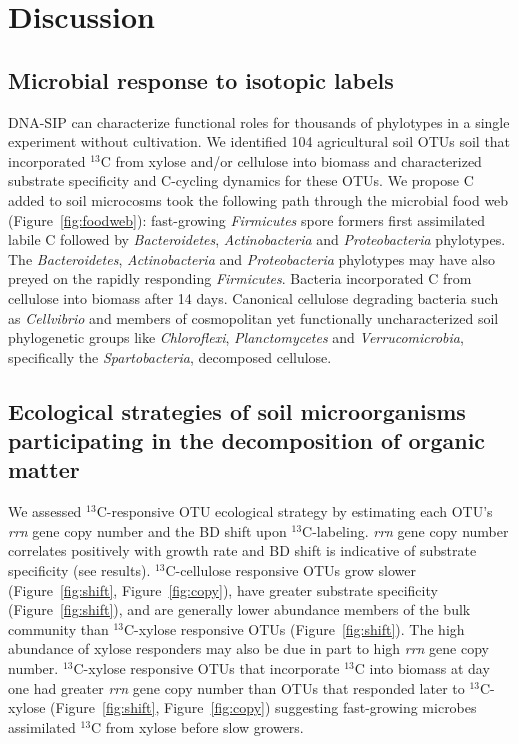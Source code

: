 \section{Discussion} 
\subsection{Microbial response to isotopic labels}
DNA-SIP can characterize functional roles for thousands of phylotypes in
a single experiment without cultivation. We identified 104 agricultural soil
OTUs soil that incorporated $^{13}$C from xylose and/or
cellulose into biomass and characterized substrate specificity and C-cycling
dynamics for these OTUs. We propose C added to soil microcosms took the
following path through the microbial food web (Figure~\ref{fig:foodweb}):
fast-growing \textit{Firmicutes} spore formers first
assimilated labile C followed by \textit{Bacteroidetes},
\textit{Actinobacteria} and \textit{Proteobacteria} phylotypes. The
\textit{Bacteroidetes}, \textit{Actinobacteria} and \textit{Proteobacteria}
phylotypes may have also preyed on the rapidly responding \textit{Firmicutes}.
Bacteria incorporated C from cellulose into biomass after
14 days. Canonical cellulose degrading bacteria such as \textit{Cellvibrio} and
members of cosmopolitan yet functionally uncharacterized soil phylogenetic
groups like \textit{Chloroflexi}, \textit{Planctomycetes} and
\textit{Verrucomicrobia}, specifically the \textit{Spartobacteria}, decomposed
cellulose.

\subsection{Ecological strategies of soil microorganisms participating in the
decomposition of organic matter}
We assessed $^{13}$C-responsive OTU ecological strategy by estimating each
OTU's \textit{rrn} gene copy number and the BD shift upon $^{13}$C-labeling.
\textit{rrn} gene copy number correlates positively with growth rate
\citep{11125085} and BD shift is indicative of substrate specificity (see
results). $^{13}$C-cellulose responsive OTUs grow
slower (Figure~\ref{fig:shift}, Figure~\ref{fig:copy}), have greater substrate
specificity (Figure~\ref{fig:shift}), and are generally lower abundance members
of the bulk community than $^{13}$C-xylose responsive OTUs
(Figure~\ref{fig:shift}). The high abundance of xylose responders may also be
due in part to high \textit{rrn} gene copy number. $^{13}$C-xylose responsive
OTUs that incorporate $^{13}$C into biomass at day one had greater \textit{rrn}
gene copy number than OTUs that responded later to $^{13}$C-xylose
(Figure~\ref{fig:shift}, Figure~\ref{fig:copy}) suggesting fast-growing
microbes assimilated $^{13}$C from xylose before slow growers.

